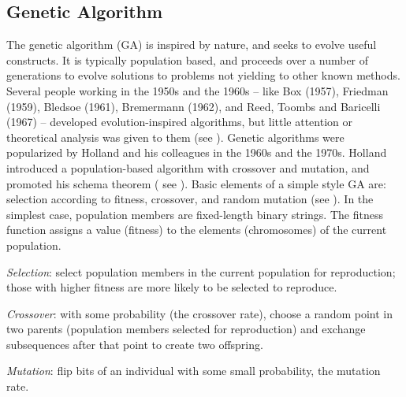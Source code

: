 \subsection{Genetic Algorithm}
The genetic algorithm (GA) is inspired by nature, and seeks to evolve useful constructs. It is typically population based, and 
proceeds over a number of generations to evolve solutions to problems not yielding to other known methods. 
Several people working in the 1950s and the 1960s -- like Box (1957), Friedman (1959),
Bledsoe (1961), Bremermann (1962), and Reed, Toombs and Baricelli (1967) -- developed evolution-inspired algorithms, 
but little attention or theoretical analysis was given to them (see \cite{Mitchell1999}). Genetic algorithms were popularized by Holland 
and his colleagues in the 1960s and the 1970s. Holland introduced a population-based algorithm with crossover and mutation, 
and promoted his schema theorem ( see \cite{Holland1975}). 
Basic elements of a simple style GA are: 
selection according to fitness, crossover, and random mutation (see \cite{Mitchell1999}). 
In the simplest case, population members are fixed-length binary strings.   
The fitness function assigns a value (fitness) to the elements (chromosomes) of 
the current population. 

\textit{Selection}: select population members in the current population for reproduction; 
those with higher fitness are more likely to be selected to reproduce.

\textit{Crossover}: with some probability (the crossover rate), choose a random point in two parents (population members selected for reproduction) 
and exchange subsequences after that point to create two offspring.

\textit{Mutation}: flip bits of an individual with some small probability, 
the mutation rate.

